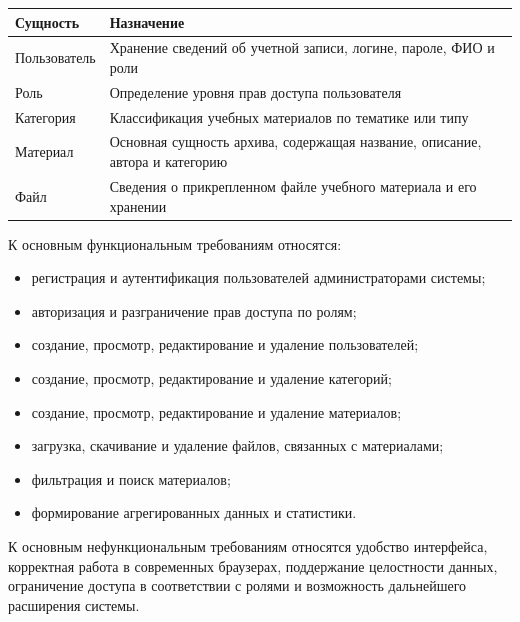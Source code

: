 \begin{center}
\begin{tabularx}{0.96\textwidth}{>{\raggedright\arraybackslash}p{3.4cm} >{\raggedright\arraybackslash}X}
\toprule
\textbf{Сущность} & \textbf{Назначение} \\
\midrule
Пользователь & Хранение сведений об учетной записи, логине, пароле, ФИО и роли \\
Роль & Определение уровня прав доступа пользователя \\
Категория & Классификация учебных материалов по тематике или типу \\
Материал & Основная сущность архива, содержащая название, описание, автора и категорию \\
Файл & Сведения о прикрепленном файле учебного материала и его хранении \\
\bottomrule
\end{tabularx}
\end{center}

К основным функциональным требованиям относятся:

\begin{itemize}[leftmargin=1.25cm]
    \item регистрация и аутентификация пользователей администраторами системы;
    \item авторизация и разграничение прав доступа по ролям;
    \item создание, просмотр, редактирование и удаление пользователей;
    \item создание, просмотр, редактирование и удаление категорий;
    \item создание, просмотр, редактирование и удаление материалов;
    \item загрузка, скачивание и удаление файлов, связанных с материалами;
    \item фильтрация и поиск материалов;
    \item формирование агрегированных данных и статистики.
\end{itemize}

К основным нефункциональным требованиям относятся удобство интерфейса, корректная работа в современных браузерах, поддержание целостности данных, ограничение доступа в соответствии с ролями и возможность дальнейшего расширения системы.